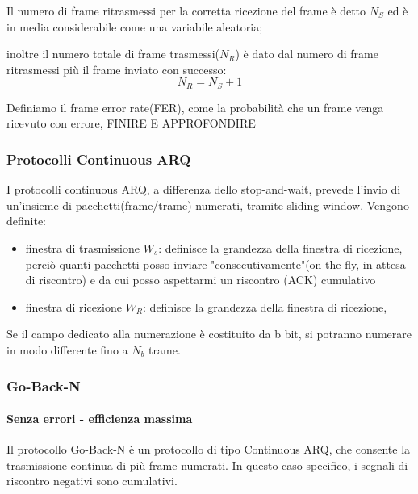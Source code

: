 Il numero di frame ritrasmessi per la corretta ricezione del frame è detto $N_S$ ed è in media considerabile come una variabile aleatoria;

inoltre il numero totale di frame trasmessi($N_R$) è dato dal numero di frame ritrasmessi più il frame inviato con successo:
\begin{equation}
N_R = N_S + 1
\end{equation}


Definiamo il frame error rate(FER), come la probabilità che un frame venga ricevuto con errore, FINIRE E APPROFONDIRE

\newpage
\subsubsection{Protocolli Continuous ARQ}
I protocolli continuous ARQ, a differenza dello stop-and-wait, prevede l'invio di un'insieme di pacchetti(frame/trame) numerati, tramite sliding window.
Vengono definite:
\begin{itemize}
    \item finestra di trasmissione $W_s$: definisce la grandezza della finestra di ricezione, perciò quanti pacchetti posso inviare "consecutivamente"(on the fly, in attesa di riscontro) e da cui posso aspettarmi un riscontro (ACK) cumulativo
    \item finestra di ricezione  $W_R$: definisce la grandezza della finestra di ricezione, 
\end{itemize} 
Se il campo dedicato alla numerazione è costituito da b bit, si potranno
numerare in modo differente fino a $N_b$ trame. 


\subsubsection{Go-Back-N}
\paragraph{Senza errori - efficienza massima}
Il protocollo Go-Back-N è un protocollo di tipo Continuous ARQ, che consente la trasmissione continua di più frame numerati. In questo caso specifico, i segnali di riscontro negativi sono cumulativi.

